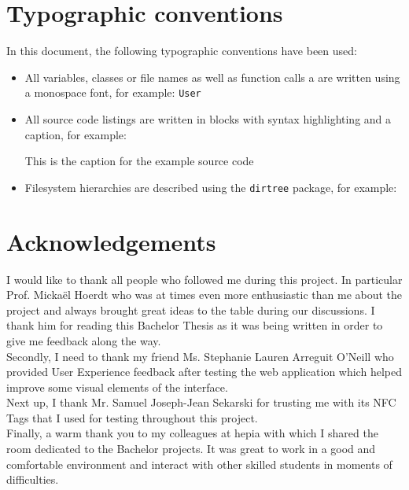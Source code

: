 \documentclass[twoside, openright,11pt,a4paper]{book}
\newenvironment{code}{\captionsetup{type=listing}}{}
\begin{document}
\chapter*{Typographic conventions}
In this document, the following typographic conventions have been used:
\begin{itemize}
	\item All variables, classes or file names as well as function calls a are written using a monospace font, for example: \verb+User+
	\item All source code listings are written in blocks with syntax highlighting and a caption, for example:
	\bigbreak
	\begin{code}
		\caption*{This is the caption for the example source code}
	\end{code}
	\item Filesystem hierarchies are described using the \verb+dirtree+ package, for example:
\end{itemize}
\chapter*{Acknowledgements}
I would like to thank all people who followed me during this project. In particular Prof. Mickaël Hoerdt who was at times even more enthusiastic than me about the project and always brought great ideas to the table during our discussions. I thank him for reading this Bachelor Thesis as it was being written in order to give me feedback along the way. \\

Secondly, I need to thank my friend Ms. Stephanie Lauren Arreguit O'Neill who provided User Experience feedback after testing the web application which helped improve some visual elements of the interface. \\

Next up, I thank Mr. Samuel Joseph-Jean Sekarski for trusting me with its NFC Tags that I used for testing throughout this project.\\


Finally, a  warm thank you to my colleagues at hepia with which I shared the room dedicated to the Bachelor projects. It was great to work in a good and comfortable environment and interact with other skilled students in moments of difficulties.
\printglossary[title=Terms and Definitions]
\newpage
\mainmatter
\pagestyle{hepia-fancy}
\end{document}
